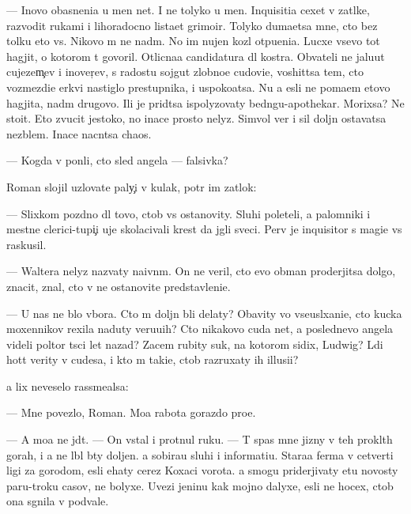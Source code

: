 \documentclass[10pt]{book}
\begin{document}
— Inovo ob{\y}asneni{\y}a u men{\ia} net. I ne tolyko u men{\ia}. Inquisiti{\y}a cexet v zat{\yi}lke, razvodit rukami i lihoradocno lista{\y}et grimoir{\yi}. Tolyko duma{\y}etsa mne, cto bez tolku eto vs{\e}. Nikovo m{\yi} ne na{\y}d{\e}m. No im nujen koz{\e}l otpu{\x}eni{\y}a. Lucxe vsevo tot hagjit, o kotorom t{\yi} govoril. Otlicna{\y}a candidatura dl{\ia} kostra. Ob{\yi}vateli ne jalu{\y}ut cujezem{\c}ev i inover{\c}ev, s radost{\y}u sojgut zlobno{\y}e cudovi{\x}e, voshit{\ia}tsa tem, cto vozmezdi{\y}e {\C}erkvi nastiglo prestupnika, i uspoko{\y}atsa. Nu a {\y}esli ne po{\y}ma{\y}em etovo hagjita, na{\y}d{\e}m drugovo. Ili je prid{\e}tsa ispolyzovaty bedn{\ia}gu-apothekar{\ia}. Mor{\x}ixsa? Ne stoit. Eto zvucit jestoko, no inace prosto nelyz{\ia}. Simvol{\yi} ver{\yi} i sil{\yi} doljn{\yi} ostavatsa nez{\yi}blem{\yi}. Inace nacn{\e}tsa chaos.

— Kogda v{\yi} pon{\ia}li, cto sled angela — falsivka?

Roman slojil uzlovat{\yi}{\y}e paly{\c}i v kulak, pot{\e}r im zat{\yi}lok:

— Slixkom pozdno dl{\ia} tovo, ctob{\yi} vs{\e} ostanovity. Sluhi poleteli, a palomniki i mestn{\yi}{\y}e clerici-tupi{\c}i uje skolacivali krest da jgli sveci. Perv{\yi}{\y} je inquisitor s magi{\y}e{\y} vs{\e} raskusil.

— Waltera nelyz{\ia} nazvaty naivn{\yi}m. On ne veril, cto {\y}evo obman proderjitsa dolgo, znacit, znal, cto v{\yi} ne ostanovite predstavleni{\y}e.

— U nas ne b{\yi}lo v{\yi}bora. Cto m{\yi} doljn{\yi} b{\yi}li delaty? Ob{\y}avity vo vseusl{\yi}xani{\y}e, cto kucka moxennikov rexila naduty veru{\y}u{\x}ih? Cto nikakovo cuda net, a poslednevo angela videli poltor{\yi} t{\yi}s{\ia}ci let nazad? Zacem rubity suk, na kotorom sidix, Ludwig? L{\io}di hot{\ia}t verity v cudesa, i kto m{\yi} taki{\y}e, ctob{\yi} razruxaty ih illusi{\y}i?

{\Y}a lix neveselo rassme{\y}alsa:

— Mne povezlo, Roman. Mo{\y}a rabota gorazdo pro{\x}e.

— A mo{\y}a ne jd{\e}t. — On vstal i prot{\ia}nul ruku. — T{\yi} spas mne jizny v teh prokl{\ia}t{\yi}h gorah, i {\y}a ne l{\io}bl{\io} b{\yi}ty doljen. {\Y}a sobira{\y}u sluhi i informati{\y}u. Stara{\y}a ferma v cetverti ligi za gorodom, {\y}esli {\y}ehaty cerez Koxac{\yf}i vorota. {\Y}a smogu priderjivaty etu novosty paru-tro{\y}ku casov, ne bolyxe. Uvezi jen{\x}inu kak mojno dalyxe, {\y}esli ne hocex, ctob{\yi} ona sgnila v podvale.
\end{document}
